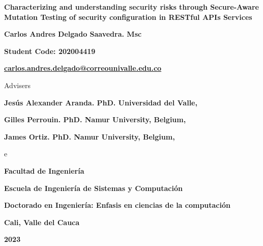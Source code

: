 
\begin{titlepage}
\begin{comment}

		\begin{center}
			{\bf Characterizing and understanding security risks through Secure-Aware Mutation Testing of security configuration in RESTful-API Services}
			\vfill
			{\bf Carlos Andres Delgado Saavedra. Msc \par}
			{\bf Código: 2004419 \par}
			{\bf carlos.andres.delgado@correounivalle.edu.co }
			\vfill
			{\bf Facultad de Ingeniería \par}
			{\bf Escuela de Ingeniería de Sistemas y Computación \par}
			{\bf Doctorado en Ingeniería: Enfasis en ciencias de la computación\par}
			{\bf Cali, Valle del Cauca \par}
			{\bf 2023 \par}
    \end{center}
\newpage
\end{comment}
	\begin{center}
			{\bf Characterizing and understanding security risks through Secure-Aware Mutation Testing of security configuration in RESTful APIs Services}
			\vfill
			{\bf Carlos Andres Delgado Saavedra. Msc \par}
			{\bf Student Code: 202004419 \par}
			{\bf \href{mailto:carlos.andres.delgado@correounivalle.edu.co}{carlos.andres.delgado@correounivalle.edu.co }}
			\vfill

		{Advisers \par}
		{\bf Jesús Alexander Aranda. PhD. Universidad del Valle, \par}
		{\bf Gilles Perrouin. PhD. Namur University, Belgium, \par}
         {\bf James Ortiz. PhD. Namur University, Belgium, \par}
			\vfill e
			{\bf Facultad de Ingeniería \par}
			{\bf Escuela de Ingeniería de Sistemas y Computación \par}
			{\bf Doctorado en Ingeniería: Enfasis en ciencias de la computación\par}
			{\bf Cali, Valle del Cauca \par}
			{\bf 2023 \par}
    \end{center}
\end{titlepage} 
